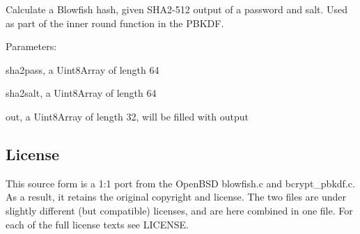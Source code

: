 Calculate a Blowfish hash, given S\+H\+A2-\/512 output of a password and salt. Used as part of the inner round function in the P\+B\+K\+DF.

Parameters\+:


\begin{DoxyItemize}
\item {\ttfamily sha2pass}, a Uint8\+Array of length 64
\item {\ttfamily sha2salt}, a Uint8\+Array of length 64
\item {\ttfamily out}, a Uint8\+Array of length 32, will be filled with output
\end{DoxyItemize}

\subsection*{License}

This source form is a 1\+:1 port from the Open\+B\+SD {\ttfamily blowfish.\+c} and {\ttfamily bcrypt\+\_\+pbkdf.\+c}. As a result, it retains the original copyright and license. The two files are under slightly different (but compatible) licenses, and are here combined in one file. For each of the full license texts see {\ttfamily L\+I\+C\+E\+N\+SE}. 